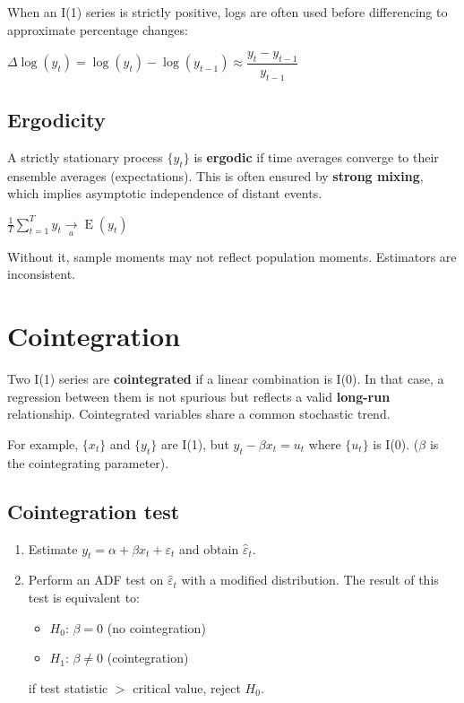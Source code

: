 \documentclass[10pt, a4paper, landscape]{article}
\DeclareMathOperator{\E}{E}
\begin{document}
\begin{multicols}{3}
When an I(1) series is strictly positive, logs are often used before differencing to approximate percentage changes:

\begin{center}
	\( \Delta \log(y_{t}) = \log(y_{t}) - \log(y_{t - 1}) \approx \dfrac{y_t - y_{t - 1}} {y_{t - 1}} \)
\end{center}

\columnbreak

\subsection*{Ergodicity}

A strictly stationary process \( \{ y_{t} \} \) is \textbf{ergodic} if time averages converge to their ensemble averages (expectations). This is often ensured by \textbf{strong mixing}, which implies asymptotic independence of distant events.

\begin{center}
	\( \frac{1}{T} \sum_{t = 1}^{T} y_{t} \underset{a}{\rightarrow} \E(y_{t}) \)
\end{center}

Without it, sample moments may not reflect population moments. Estimators are inconsistent.

\section*{Cointegration}

Two I(1) series are \textbf{cointegrated} if a linear combination is I(0). In that case, a regression between them is not spurious but reflects a valid \textbf{long-run} relationship. Cointegrated variables share a common stochastic trend.

For example, \( \{ x_{t} \} \) and \( \{ y_{t} \} \) are I(1), but \( y_{t} - \beta x_{t} = u_{t} \) where \( \{ u_{t} \} \) is I(0). (\( \beta \) is the cointegrating parameter).

\subsection*{Cointegration test}

\begin{enumerate}[leftmargin=*]
	\item Estimate \( y_{t} = \alpha + \beta x_{t} + \varepsilon_{t} \) and obtain \( \hat{\varepsilon}_{t} \).
	\item Perform an ADF test on \( \hat{\varepsilon}_{t} \) with a modified distribution.
	The result of this test is equivalent to:
	\begin{itemize}[leftmargin=*]
		\item \( H_{0} \): \( \beta = 0 \) (no cointegration)
		\item \( H_{1} \): \( \beta \neq 0 \) (cointegration)
	\end{itemize}
	if test statistic \( > \) critical value, reject \( H_{0} \).
\end{enumerate}


\end{multicols}
\end{document}
